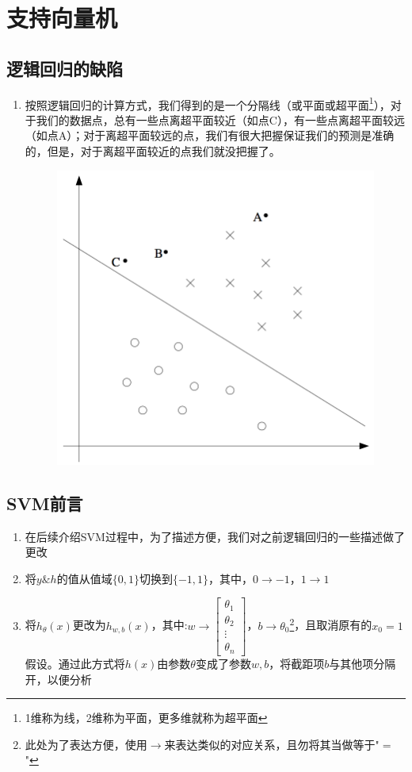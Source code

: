 \section{支持向量机}

\subsection{逻辑回归的缺陷}
\begin{enumerate}
	\item 按照逻辑回归的计算方式，我们得到的是一个分隔线（或平面或超平面\footnote{1维称为线，2维称为平面，更多维就称为超平面}），对于我们的数据点，总有一些点离超平面较近（如点C），有一些点离超平面较远（如点A）；对于离超平面较远的点，我们有很大把握保证我们的预测是准确的，但是，对于离超平面较近的点我们就没把握了。
	\begin{figure}[htbp]
		\centering
		\includegraphics[scale=0.5]{images/逻辑回归缺陷讲述}
	\end{figure}
\end{enumerate}

\subsection{SVM前言}
\begin{enumerate}
	\item 在后续介绍SVM过程中，为了描述方便，我们对之前逻辑回归的一些描述做了更改
	\item 将$y \& h$的值从值域$\{0,1\}$切换到$\{-1, 1\}$，其中，$0\to -1$，$1\to 1$
	\item 将$h_\theta(x)$更改为$h_{w,b}(x)$，其中:$w \to \left[\begin{matrix}\theta_1 \\ \theta_2 \\ \vdots \\ \theta_n  \end{matrix}\right]$，$b \to \theta_0$\footnote{此处为了表达方便，使用$\to$来表达类似的对应关系，且勿将其当做等于"$=$"}，且取消原有的$x_0=1$假设。通过此方式将$h(x)$由参数$\theta$变成了参数$w, b$，将截距项$b$与其他项分隔开，以便分析
\end{enumerate}

